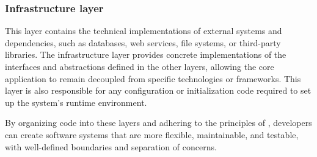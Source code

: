 \subsubsection{Infrastructure layer}
This layer contains the technical implementations of external systems and dependencies,
such as databases, web services, file systems, or third-party libraries. The
infrastructure layer provides concrete implementations of the interfaces and abstractions
defined in the other layers, allowing the core application to remain decoupled from
specific technologies or frameworks. This layer is also responsible for any configuration
or initialization code required to set up the system's runtime environment.

By organizing code into these layers and adhering to the principles of \ca,
developers can create software systems that are more flexible, maintainable, and testable,
with well-defined boundaries and separation of concerns.